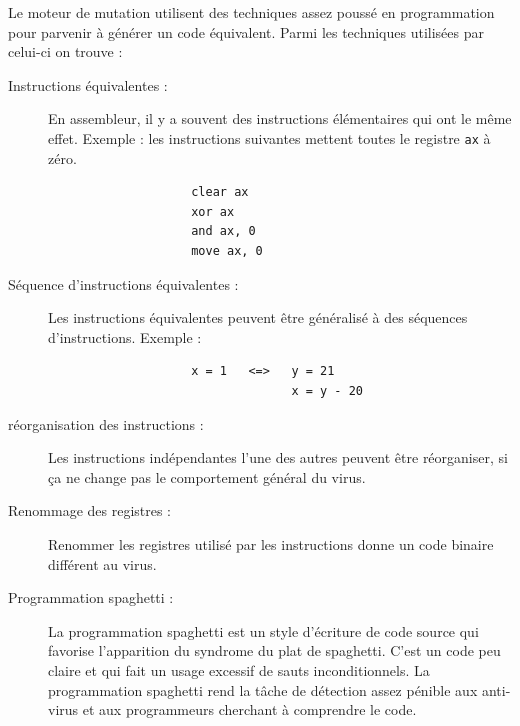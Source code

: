         Le moteur de mutation utilisent des techniques assez poussé en programmation pour 
        parvenir à générer un code équivalent. Parmi les techniques utilisées par celui-ci on trouve :
        \begin{description}
            \item[Instructions équivalentes :] En assembleur, il y a souvent des instructions élémentaires qui ont 
                le même effet. Exemple : les instructions suivantes mettent toutes le registre \verb|ax| à zéro.
                \begin{verbatim}
                    clear ax
                    xor ax
                    and ax, 0
                    move ax, 0
                \end{verbatim}

            \item[Séquence d'instructions équivalentes :] Les instructions équivalentes peuvent être généralisé à
                des séquences d'instructions. Exemple : 
                \begin{verbatim}
                    x = 1   <=>   y = 21
                                  x = y - 20
                \end{verbatim}
            \item[réorganisation des instructions :] Les instructions indépendantes l'une des autres peuvent 
                être réorganiser, si ça ne change pas le comportement général du virus.

            \item[Renommage des registres :] Renommer les registres utilisé par les instructions donne un code binaire
                différent au virus.

            \item[Programmation spaghetti :] La programmation spaghetti est un style d'écriture de code source qui
                favorise l'apparition du syndrome du plat de spaghetti. C'est un code peu claire et qui fait un 
                usage excessif de sauts inconditionnels. La programmation spaghetti rend la tâche de détection 
                assez pénible aux anti-virus et aux programmeurs cherchant à comprendre le code.


\end{description}
